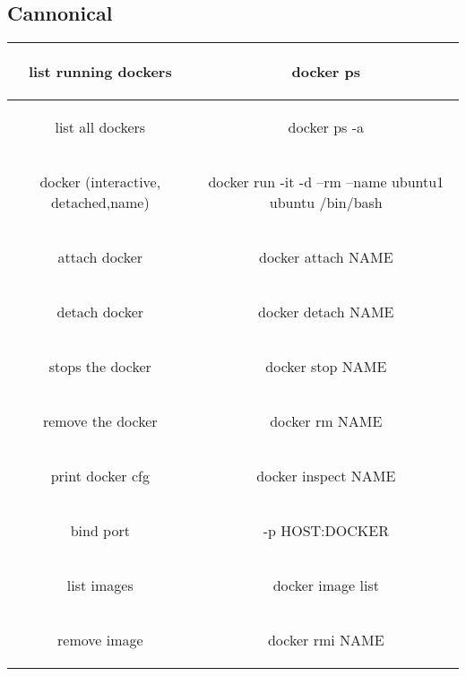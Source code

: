 
\section*{}
\subsection*{Cannonical}
\begin{tabular}{|c||c|} %
    \hline
    list running dockers & \begin{bash}
docker ps
    \end{bash} \\ \hline
    list all dockers & \begin{bash}
docker ps -a
    \end{bash} \\ \hline
    docker (interactive, detached,name) & \begin{bash}
docker run -it -d --rm --name ubuntu1 ubuntu /bin/bash
    \end{bash} \\ \hline
    attach docker & \begin{bash}
docker attach NAME
    \end{bash} \\ \hline
    detach docker & \begin{bash}
docker detach NAME
    \end{bash} \\ \hline
    stops the docker & \begin{bash}
docker stop NAME
    \end{bash} \\ \hline
    remove the docker & \begin{bash}
docker rm NAME
    \end{bash} \\ \hline
    print docker cfg & \begin{bash}
docker inspect NAME
    \end{bash} \\ \hline
bind port & \begin{bash}
        -p HOST:DOCKER
    \end{bash} \\ \hline
list images & \begin{bash}
        docker image list
    \end{bash} \\ \hline
remove image & \begin{bash}
        docker rmi NAME
    \end{bash} \\ \hline
\end{tabular}

